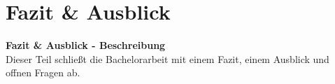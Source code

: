 
\newcommand{\fAusklang}{080_ausklang}

\part{Fazit \& Ausblick}
\textbf{Fazit \& Ausblick - Beschreibung}\\
Dieser Teil schließt die Bachelorarbeit mit einem Fazit, einem Ausblick und offnen Fragen ab.





